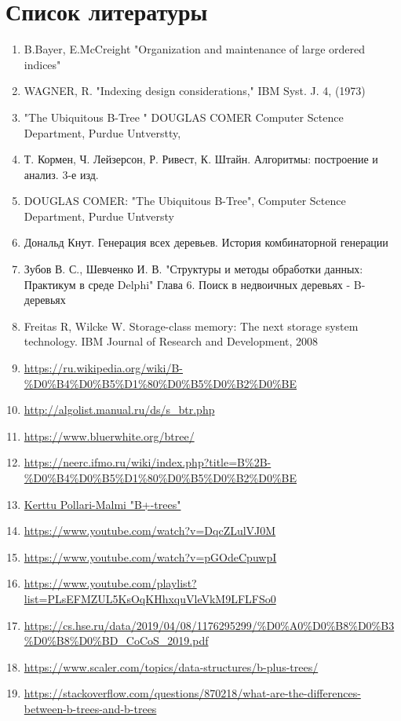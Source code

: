 \documentclass{article}
\begin{document}
\section{Список литературы}
\begin{enumerate}
\item B.Bayer, E.McCreight "Organization and maintenance of large ordered indices"
\item WAGNER, R. "Indexing design considerations," IBM Syst. J. 4, (1973)
\item "The Ubiquitous B-Tree " DOUGLAS COMER Computer Sctence Department, Purdue Untverstty, 
\item Т. Кормен, Ч. Лейзерсон, Р. Ривест, К. Штайн. Алгоритмы: построение и анализ. 3-е изд. 
\item DOUGLAS COMER: "The Ubiquitous B-Tree", Computer Sctence Department, Purdue Untversty
\item Дональд Кнут. Генерация всех деревьев. История комбинаторной генерации 
\item Зубов В. С., Шевченко И. В. "Структуры и методы обработки данных: Практикум в среде Delphi" Глава 6. Поиск в недвоичных деревьях - B-деревьях 
\item Freitas R, Wilcke W. Storage-class memory: The next storage system technology. IBM Journal of Research and Development, 2008 
\item \url{https://ru.wikipedia.org/wiki/B-%D0%B4%D0%B5%D1%80%D0%B5%D0%B2%D0%BE}
\item \url{http://algolist.manual.ru/ds/s_btr.php}
\item \url{https://www.bluerwhite.org/btree/}
\item \url{https://neerc.ifmo.ru/wiki/index.php?title=B%2B-%D0%B4%D0%B5%D1%80%D0%B5%D0%B2%D0%BE}
\item \url{Kerttu Pollari-Malmi "B+-trees"}
\item \url{https://www.youtube.com/watch?v=DqcZLulVJ0M}
\item \url{https://www.youtube.com/watch?v=pGOdeCpuwpI}
\item \url{https://www.youtube.com/playlist?list=PLsEFMZUL5KsOqKHhxquVleVkM9LFLFSo0}
\item \url{https://cs.hse.ru/data/2019/04/08/1176295299/%D0%A0%D0%B8%D0%B3%D0%B8%D0%BD_CoCoS_2019.pdf}
\item \url{https://www.scaler.com/topics/data-structures/b-plus-trees/}
\item \url{https://stackoverflow.com/questions/870218/what-are-the-differences-between-b-trees-and-b-trees}

\end{enumerate}
\end{document}
